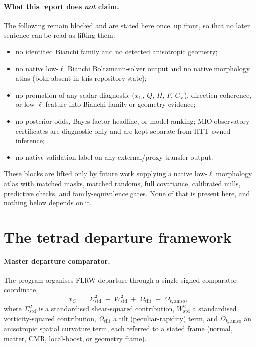 \documentclass[11pt,a4paper]{article}
\newcommand{\xC}{x_{C}}
\newcommand{\Sigstd}{\Sigma^{2}_{\mathrm{std}}}
\newcommand{\Wstd}{W^{2}_{\mathrm{std}}}
\newcommand{\Otilt}{\Omega_{\mathrm{tilt}}}
\newcommand{\Okaniso}{\Omega_{k,\mathrm{aniso}}}
\newcommand{\GF}{G_{F}}
\theoremstyle{plain}
\theoremstyle{definition}
\begin{document}
\paragraph{What this report does \emph{not} claim.}
The following remain blocked and are stated here once, up front, so
that no later sentence can be read as lifting them:
\begin{itemize}[leftmargin=1.4em,itemsep=2pt]
  \item no identified Bianchi family and no detected anisotropic
        geometry;
  \item no native low-$\ell$ Bianchi Boltzmann-solver output and no
        native morphology atlas (both absent in this repository
        state);
  \item no promotion of any scalar diagnostic ($\xC$, $Q$, $\Pi$,
        $F$, $\GF$), direction coherence, or low-$\ell$ feature into
        Bianchi-family or geometry evidence;
  \item no posterior odds, Bayes-factor headline, or model ranking;
        MIO observatory certificates are diagnostic-only and are
        kept separate from HTT-owned inference;
  \item no native-validation label on any external/proxy transfer
        output.
\end{itemize}
These blocks are lifted only by future work supplying a native
low-$\ell$ morphology atlas with matched masks, matched randoms,
full covariance, calibrated nulls, predictive checks, and
family-equivalence gates. None of that is present here, and nothing
below depends on it.

\section{The tetrad departure framework}
\label{sec:framework}

\paragraph{Master departure comparator.}
The program organises FLRW departure through a single signed
comparator coordinate,
\begin{equation}
  \xC \;=\; \Sigstd \;-\; \Wstd \;+\; \Otilt \;+\; \Okaniso,
  \label{eq:xc}
\end{equation}
where $\Sigstd$ is a standardised shear-squared contribution,
$\Wstd$ a standardised vorticity-squared contribution, $\Otilt$ a
tilt (peculiar-rapidity) term, and $\Okaniso$ an anisotropic spatial
curvature term, each referred to a stated frame (normal, matter,
CMB, local-boost, or geometry frame).
\end{document}
